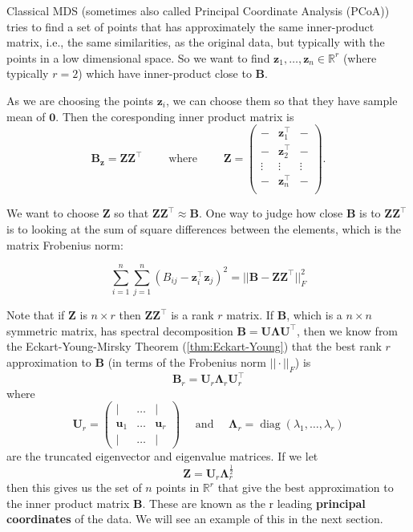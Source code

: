 \documentclass[
]{book}
\theoremstyle{definition}
\theoremstyle{definition}
\theoremstyle{definition}
\theoremstyle{definition}
\theoremstyle{remark}
\begin{document}
Classical MDS (sometimes also called Principal Coordinate Analysis (PCoA)) tries to find a set of points that has approximately the same inner-product matrix, i.e., the same similarities, as the original data, but typically with the points in a low dimensional space. So we want to find \(\mathbf z_1, \ldots, \mathbf z_n \in \mathbb{R}^r\) (where typically \(r=2\)) which have inner-product close to \(\mathbf B\).

As we are choosing the points \(\mathbf z_i\), we can choose them so that they have sample mean of \({\boldsymbol 0}\). Then the coresponding inner product matrix is
\[\mathbf B_\mathbf z= \mathbf Z\mathbf Z^\top \qquad \mbox{ where } \qquad \mathbf Z= 
\begin{pmatrix} - & \mathbf z_1^\top &-\\
 - & \mathbf z_2^\top& -\\
 \vdots & \vdots & \vdots\\
  - & \mathbf z_n^\top  &-\\
\end{pmatrix}.\]

We want to choose \(\mathbf Z\) so that \(\mathbf Z\mathbf Z^\top \approx  \mathbf B\). One way to judge how close \(\mathbf B\) is to \(\mathbf Z\mathbf Z^\top\) is to looking at the sum of square differences between the elements, which is the matrix Frobenius norm:

\[\sum_{i=1}^n\sum_{j=1}^n (B_{ij}-\mathbf z_i^\top \mathbf z_j)^2 = ||\mathbf B- \mathbf Z\mathbf Z^\top||^2_F\]

Note that if \(\mathbf Z\) is \(n \times r\) then \(\mathbf Z\mathbf Z^\top\) is a rank \(r\) matrix. If \(\mathbf B\), which is a \(n\times n\) symmetric matrix, has spectral decomposition
\(\mathbf B= \mathbf U\boldsymbol \Lambda\mathbf U^\top\), then we know from the Eckart-Young-Mirsky Theorem (\ref{thm:Eckart-Young}) that the best rank \(r\) approximation to \(\mathbf B\) (in terms of the Frobenius norm \(||\cdot||_F\)) is
\[\mathbf B_r = \mathbf U_r \boldsymbol \Lambda_r \mathbf U_r^\top\]
where
\[\mathbf U_r = \begin{pmatrix} |&\ldots &|\\
\mathbf u_1 &\ldots & \mathbf u_r\\
|&\ldots &|\end{pmatrix} \quad\mbox{ and }\quad \boldsymbol \Lambda_r = \operatorname{diag}(\lambda_1, \ldots, \lambda_r)\]
are the truncated eigenvector and eigenvalue matrices.
If we let
\[\mathbf Z= \mathbf U_r \boldsymbol \Lambda_r^{\frac{1}{2}}\]
then this gives us the set of \(n\) points in \(\mathbb{R}^r\) that give the best approximation to the inner product matrix \(\mathbf B\). These are known as the r leading \textbf{principal coordinates} of the data. We will see an example of this in the next section.
\end{document}
